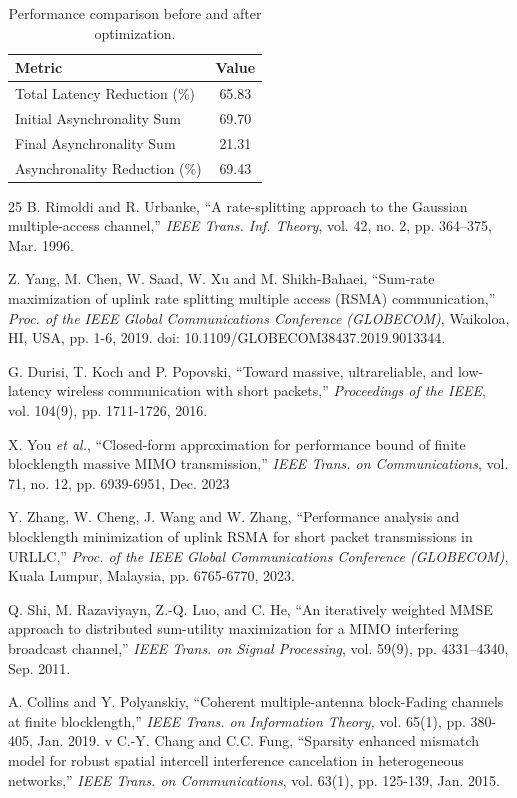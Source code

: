 \documentclass[a4paper, 12pt, onecolumn, journal, twoside, draftclsnofoot]{IEEEtran}
\begin{document}
\begin{table}[h]
\centering
\begin{tabular}{l c}
\hline
Metric & Value \\
\hline
Total Latency Reduction (\%) & 65.83 \\
Initial Asynchronality Sum & 69.70 \\
Final Asynchronality Sum & 21.31 \\
Asynchronality Reduction (\%) & 69.43 \\
\hline
\end{tabular}
\caption{Performance comparison before and after optimization.}
\end{table}
\newpage
\begin{thebibliography}{25}
B. Rimoldi and R. Urbanke, ``A rate-splitting approach to the Gaussian multiple-access channel,'' \emph{IEEE Trans. Inf. Theory},  vol. 42, no. 2, pp. 364–375, Mar. 1996.

Z. Yang, M. Chen, W. Saad, W. Xu and M. Shikh-Bahaei, ``Sum-rate maximization of uplink rate splitting multiple access (RSMA) communication,'' \emph{Proc. of the IEEE Global Communications Conference (GLOBECOM)}, Waikoloa, HI, USA, pp. 1-6, 2019.  doi: 10.1109/GLOBECOM38437.2019.9013344.

G. Durisi, T. Koch and P. Popovski, ``Toward massive, ultrareliable, and low-latency wireless communication with short packets,'' \emph{Proceedings of the IEEE}, vol. 104(9), pp. 1711-1726, 2016.

X. You \emph{et al.}, ``Closed-form approximation for performance bound of finite blocklength massive MIMO transmission,'' \emph{IEEE Trans. on Communications}, vol. 71, no. 12, pp. 6939-6951, Dec. 2023

Y. Zhang, W. Cheng, J. Wang and W. Zhang, ``Performance analysis and blocklength minimization of uplink RSMA for short packet transmissions in URLLC,'' \emph{Proc. of the IEEE Global Communications Conference (GLOBECOM)}, Kuala Lumpur, Malaysia, pp. 6765-6770, 2023.

Q. Shi, M. Razaviyayn, Z.-Q. Luo, and C. He, ``An iteratively weighted MMSE approach to distributed sum-utility maximization for a MIMO interfering broadcast channel,'' \emph{IEEE Trans. on Signal Processing}, vol. 59(9), pp. 4331–4340, Sep. 2011.

A. Collins and Y. Polyanskiy, ``Coherent multiple-antenna block-Fading channels at finite blocklength,'' \emph{IEEE Trans. on Information Theory,} vol. 65(1), pp. 380-405, Jan. 2019.
v
C.-Y. Chang and C.C. Fung, ``Sparsity enhanced mismatch model for robust spatial intercell interference cancelation in heterogeneous networks,'' \emph{IEEE Trans. on Communications}, vol. 63(1), pp. 125-139, Jan. 2015.


\end{thebibliography}
\end{document}
